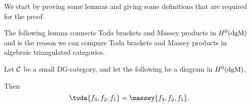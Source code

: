 We start by proving some lemmas and giving some definitions that are required for the proof.

The following lemma connects Toda brackets and Massey products in \( H^0(\operatorname{dgM}) \) and is the reason we can compare Toda brackets and Massey products in algebraic triangulated categories.

\begin{theorem}
    \label{thm:dgm_massey_equal_toda}
    Let \( {\mathcal{C}} \) be a small DG-category, and let the following be a diagram in \( H^0(\operatorname{dgM}) \),
    \begin{center}
    \end{center}
    Then
    \[
        \toda{f_3, f_2, f_1} = \massey{f_3, f_2, f_1}.
    \]
\end{theorem}
